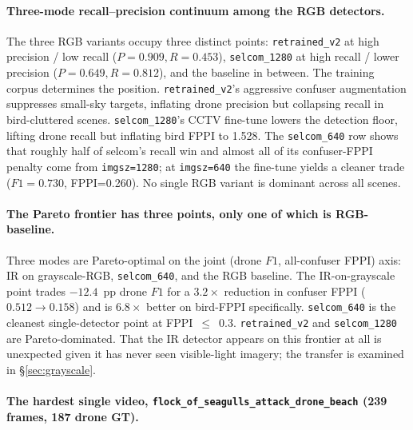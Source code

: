 \paragraph{Three-mode recall--precision continuum among the RGB detectors.}
The three RGB variants occupy three distinct points: \texttt{retrained\_v2} at high precision / low recall ($P=0.909, R=0.453$), \texttt{selcom\_1280} at high recall / lower precision ($P=0.649, R=0.812$), and the baseline in between. The training corpus determines the position. \texttt{retrained\_v2}'s aggressive confuser augmentation suppresses small-sky targets, inflating drone precision but collapsing recall in bird-cluttered scenes. \texttt{selcom\_1280}'s CCTV fine-tune lowers the detection floor, lifting drone recall but inflating bird FPPI to 1.528. The \texttt{selcom\_640} row shows that roughly half of selcom's recall win and almost all of its confuser-FPPI penalty come from \texttt{imgsz=1280}; at \texttt{imgsz=640} the fine-tune yields a cleaner trade ($F1=0.730$, FPPI=0.260). No single RGB variant is dominant across all scenes.

\paragraph{The Pareto frontier has three points, only one of which is RGB-baseline.}
Three modes are Pareto-optimal on the joint (drone $F1$, all-confuser FPPI) axis: IR on grayscale-RGB, \texttt{selcom\_640}, and the RGB baseline. The IR-on-grayscale point trades $-12.4$~pp drone $F1$ for a $3.2\times$ reduction in confuser FPPI ($0.512 \to 0.158$) and is $6.8\times$ better on bird-FPPI specifically. \texttt{selcom\_640} is the cleanest single-detector point at FPPI~$\leq$~0.3. \texttt{retrained\_v2} and \texttt{selcom\_1280} are Pareto-dominated. That the IR detector appears on this frontier at all is unexpected given it has never seen visible-light imagery; the transfer is examined in \S\ref{sec:grayscale}.

\paragraph{The hardest single video, \texttt{flock\_of\_seagulls\_attack\_drone\_beach} (239 frames, 187 drone GT).}

